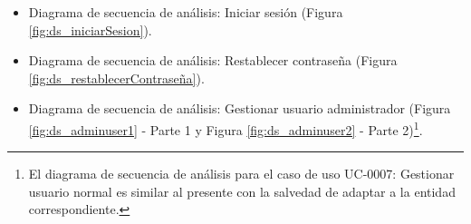 \documentclass[12pt,a4paper, twoside]{report}
\begin{document}
\begin{itemize}
		\newpage
		
		\item Diagrama de secuencia de análisis: Iniciar sesión (Figura \ref{fig:ds_iniciarSesion}).
		

		\newpage
		
		\item Diagrama de secuencia de análisis: Restablecer contraseña (Figura \ref{fig:ds_restablecerContraseña}).
		
		
		\newpage
		
		\item Diagrama de secuencia de análisis: Gestionar usuario administrador (Figura \ref{fig:ds_adminuser1} - Parte 1 y Figura \ref{fig:ds_adminuser2} - Parte 2)\footnote{El diagrama de secuencia de análisis para el caso de uso UC-0007: Gestionar usuario normal es similar al presente con la salvedad de adaptar a la entidad correspondiente.}.
		 
		
		\newpage
		

\end{itemize}
\end{document}
